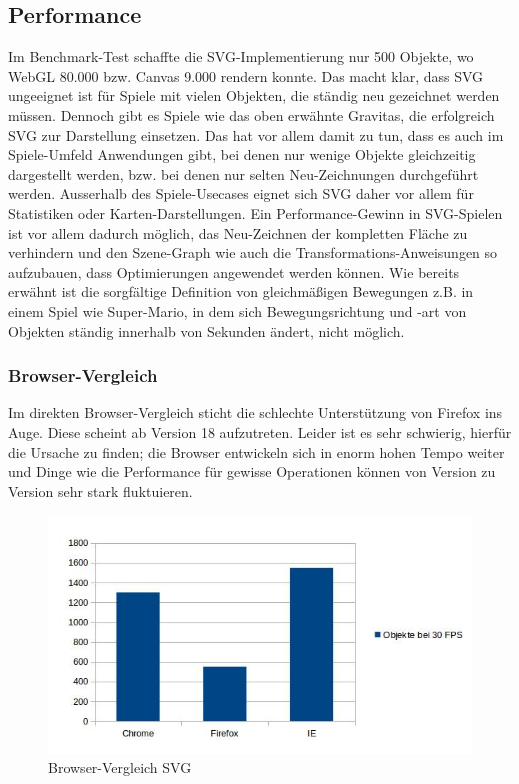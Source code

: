 \documentclass[a4paper, 12pt]{article}
\begin{document}
\subsection{Performance}
Im Benchmark-Test schaffte die SVG-Implementierung nur 500 Objekte, wo WebGL 80.000 bzw. Canvas 9.000 rendern konnte. Das macht klar, dass SVG ungeeignet ist für Spiele mit vielen Objekten, die ständig neu gezeichnet werden müssen. Dennoch gibt es Spiele wie das oben erwähnte Gravitas, die erfolgreich SVG zur Darstellung einsetzen. Das hat vor allem damit zu tun, dass es auch im Spiele-Umfeld Anwendungen gibt, bei denen nur wenige Objekte gleichzeitig dargestellt werden, bzw. bei denen nur selten Neu-Zeichnungen durchgeführt werden. Ausserhalb des Spiele-Usecases eignet sich SVG daher vor allem für Statistiken oder Karten-Darstellungen. Ein Performance-Gewinn in SVG-Spielen ist vor allem dadurch möglich, das Neu-Zeichnen der kompletten Fläche zu verhindern und den Szene-Graph wie auch die Transformations-Anweisungen so aufzubauen, dass Optimierungen angewendet werden können. Wie bereits erwähnt ist die sorgfältige Definition von gleichmäßigen Bewegungen z.B. in einem Spiel wie Super-Mario, in dem sich Bewegungsrichtung und -art von Objekten ständig innerhalb von Sekunden ändert, nicht möglich.
\subsubsection{Browser-Vergleich} Im direkten Browser-Vergleich sticht die schlechte Unterstützung von Firefox ins Auge. Diese scheint ab Version 18 aufzutreten. Leider ist es sehr schwierig, hierfür die Ursache zu finden; die Browser entwickeln sich in enorm hohen Tempo weiter und Dinge wie die Performance für gewisse Operationen können von Version zu Version sehr stark fluktuieren.
\begin{figure}[H]
	\includegraphics[width=\textwidth]{assets/browser_comp_svg} 
	\caption{Browser-Vergleich SVG}
	\label{browser_comp_svg}
\end{figure}
\newpage
\end{document}

